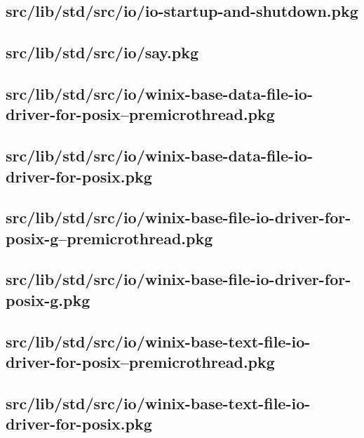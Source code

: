 \subsection{src/lib/std/src/io/io-startup-and-shutdown.pkg}


\subsection{src/lib/std/src/io/say.pkg}


\subsection{src/lib/std/src/io/winix-base-data-file-io-driver-for-posix--premicrothread.pkg}


\subsection{src/lib/std/src/io/winix-base-data-file-io-driver-for-posix.pkg}


\subsection{src/lib/std/src/io/winix-base-file-io-driver-for-posix-g--premicrothread.pkg}


\subsection{src/lib/std/src/io/winix-base-file-io-driver-for-posix-g.pkg}


\subsection{src/lib/std/src/io/winix-base-text-file-io-driver-for-posix--premicrothread.pkg}


\subsection{src/lib/std/src/io/winix-base-text-file-io-driver-for-posix.pkg}


